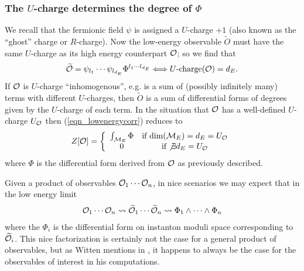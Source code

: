 \documentclass[12pt, onecolumn]{article}
\newenvironment{remark}[1][Remark]{\begin{trivlist}
\item[\hskip \labelsep {\bfseries #1}]}{\end{trivlist}}
\begin{document}
\subsubsection{The $U$-charge determines the degree of $\Phi$}
We recall that the fermionic field $\psi$ is assigned a $U$-charge $+1$ (also known as the ``ghost'' charge or $R$-charge).  Now the low-energy observable $\widetilde{O}$ must have the same $U$-charge as its high energy counterpart ${\cal O}$; so we find that
\begin{align*}
\widetilde{\cal O}=\psi_{l_{1}}\cdots\psi_{l_{d_{E}}}\Phi^{l_{1} \cdots l_{d_{E}}} \Longleftrightarrow \text{$U$-charge$({\cal O})=d_{E}$}.
\end{align*}
If ${\cal O}$ is $U$-charge ``inhomogenous'', e.g. is a sum of (possibly infinitely many) terms with different $U$-charges, then $\widetilde{O}$ is a sum of differential forms of degrees given by the $U$-charge of each term.  In the situation that ${\cal O}$ has a well-defined $U$-charge $U_{\cal O}$ then (\ref{eqn_lowenergycorr}) reduces to
\begin{align*}
Z[{\cal O}]=\left\{
\begin{array}{cc}
\int_{{\cal M}_{E}} \Phi & \text{if $\text{dim}({\cal M}_{E})=d_{E}=U_{\cal O}$}\\
0 & \text{if $\not \exists d_{E} = U_{\cal O}$}
\end{array}
\right.
\end{align*}
where $\Phi$ is the differential form derived from ${\cal O}$ as previously described.

\begin{remark}
Given a product of observables ${\cal O}_{1} \cdots {\cal O}_{n}$, in nice scenarios we may expect that in the low energy limit
\begin{align*}
{\cal O}_{1} \cdots {\cal O}_{n} \rightsquigarrow \widetilde{\cal O}_{1} \cdots \widetilde{\cal O}_{n} \rightsquigarrow \Phi_{1} \wedge \cdots \wedge \Phi_{n}
\end{align*}
where the $\Phi_{i}$ is the differential form on instanton moduli space corresponding to $\widetilde{\cal O}_{i}$.  This nice factorization is certainly not the case for a general product of observables, but as Witten mentions in \cite{Witten_1988}, it happens to always be the case for the observables of interest in his computations.
\end{remark}
\end{document}
